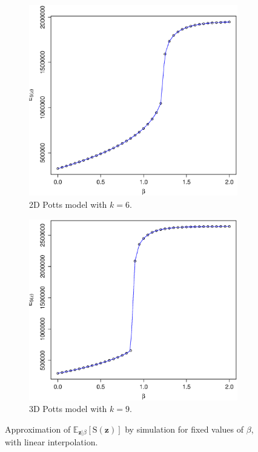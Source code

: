 \documentclass[nojss,shortnames]{jss}\usepackage[]{graphicx}\usepackage[]{color}
\begin{document}
\begin{figure}
        \centering
        \begin{subfigure}{0.75\textwidth}
                \includegraphics[width=\textwidth]{path2d.eps}
                \caption{2D Potts model with $k=6$.}
                \label{f:path2d}
        \end{subfigure}%
\qquad
        \begin{subfigure}{0.75\textwidth}
                \includegraphics[width=\textwidth]{path3d.eps}
                \caption{3D Potts model with $k=9$.}
                \label{f:path3d}
        \end{subfigure}%
\caption[Approximation of the sufficient statistic by simulation]{Approximation of $\mathbb{E}_{\mathbf{z} | \beta}[\mathrm{S}(\mathbf{z})]$ by simulation for fixed values of $\beta$, with linear interpolation.}
\label{f:path}
\end{figure}
\end{document}

